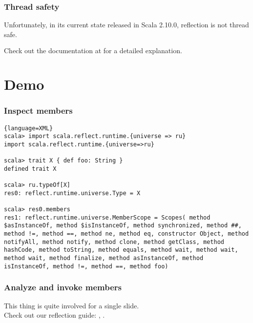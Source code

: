 \documentclass[hyperref={bookmarks=false}]{beamer}
\begin{document}
\begin{frame}[fragile]
\frametitle{Thread safety}

Unfortunately, in its current state released in Scala 2.10.0, reflection is not thread safe.

Check out the documentation at  for a detailed explanation.
\end{frame}

\section{Demo}

\begin{frame}[fragile]
\frametitle{Inspect members}

\begin{lstlisting}{language=XML}
scala> import scala.reflect.runtime.{universe => ru}
import scala.reflect.runtime.{universe=>ru}

scala> trait X { def foo: String }
defined trait X

scala> ru.typeOf[X]
res0: reflect.runtime.universe.Type = X

scala> res0.members
res1: reflect.runtime.universe.MemberScope = Scopes( method $asInstanceOf, method $isInstanceOf, method synchronized, method ##, method !=, method ==, method ne, method eq, constructor Object, method notifyAll, method notify, method clone, method getClass, method hashCode, method toString, method equals, method wait, method wait, method wait, method finalize, method asInstanceOf, method isInstanceOf, method !=, method ==, method foo)
\end{lstlisting}
\end{frame}

\begin{frame}[fragile]
\frametitle{Analyze and invoke members}

This thing is quite involved for a single slide.\\ Check out our reflection guide: , .
\end{frame}
\end{document}
